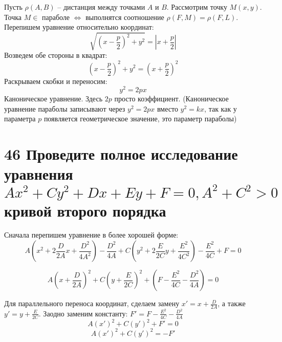 \documentclass[a4paper,12pt,twoside]{article}
\begin{document}
\smallskip 

Пусть $\rho(A,B) $ – дистанция между точками $A$ и $B$. Рассмотрим точку $M(x,y)$. 
Точка $M\in$ параболе $\iff$ выполнятся соотношение
$\rho(F,M) = \rho(F,L)$. Перепишем уравнение относительно координат:
\[
\sqrt{ \left( x - \frac{p}{2} \right)^2 + y^2  } = | x + \frac{p}{2} |
\]
Возведем обе стороны в квадрат:
\[
\left( x - \frac{p}{2} \right)^2 + y^2 =  \left( x + \frac{p}{2} \right)^2
\]
Раскрываем скобки и переносим:
\[
y^2 = 2px
\]
Каноническое уравнение. Здесь $2p$ просто коэффициент. 
(Каноническое уравнение параболы записывают через $y^2 = 2px$ 
вместо $y^2 = kx$, так как у параметра $p$ появляется геометрическое 
значение, это параметр параболы)






\section{46 Проведите полное исследование уравнения \texorpdfstring{$ Ax^2 + Cy^2 + Dx + Ey + F = 0, A^2 + C^2 > 0$}{TEXT} кривой второго порядка}

Сначала перепишем уравнение в более хорошей форме:
\[
    A \left(  x^2 + 2\frac{D}{2A}x + \frac{D^2}{4A^2}  \right) - \frac{D^2}{4A} 
+ C \left(  y^2 + 2\frac{E}{2C}y + \frac{E^2}{4C^2}  \right) - \frac{E^2}{4C}
+ F = 0 
\]

\[
    A \left( x + \frac{D}{2A} \right) ^2 
+ C \left( y + \frac{E}{2C}  \right) ^2 
+ \left( F - \frac{E^2}{4C}  - \frac{D^2}{4A} \right) = 0
\]

Для параллельного переноса координат, сделаем замену 
$x' = x + \frac{D}{2A}$, а также 
$y' = y + \frac{E}{2C}$. 
Заодно заменим константу:
$F' = F - \frac{E^2}{4C}  - \frac{D^2}{4A}$
\[
A(x')^2 + C(y')^2 + F' = 0
\]
\[
A(x')^2 + C(y')^2 = - F'
\]
\end{document}
